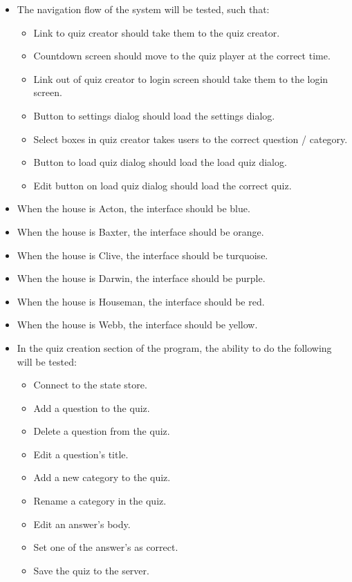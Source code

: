 \begin{itemize}
  \item The navigation flow of the system will be tested, such that:
  \begin{itemize}
    \item Link to quiz creator should take them to the quiz creator.
    \item Countdown screen should move to the quiz player at the correct time.
    \item Link out of quiz creator to login screen should take them to the login screen.
    \item Button to settings dialog should load the settings dialog.
    \item Select boxes in quiz creator takes users to the correct question / category.
    \item Button to load quiz dialog should load the load quiz dialog.
    \item Edit button on load quiz dialog should load the correct quiz.
  \end{itemize}

  \item When the house is Acton, the interface should be blue.
  \item When the house is Baxter, the interface should be orange.
  \item When the house is Clive, the interface should be turquoise.
  \item When the house is Darwin, the interface should be purple.
  \item When the house is Houseman, the interface should be red.
  \item When the house is Webb, the interface should be yellow.

  \item In the quiz creation section of the program, the ability to do the following will be tested:
  \begin{itemize}
    \item Connect to the state store.
    \item Add a question to the quiz.
    \item Delete a question from the quiz.
    \item Edit a question's title.
    \item Add a new category to the quiz.
    \item Rename a category in the quiz.
    \item Edit an answer's body.
    \item Set one of the answer's as correct.
    \item Save the quiz to the server.
  \end{itemize}


\end{itemize}
